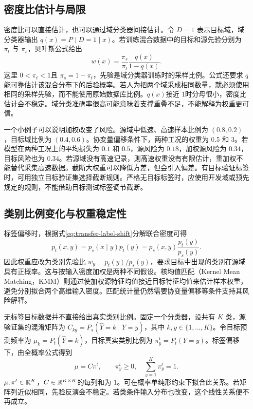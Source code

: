 \subsection{密度比估计与局限}
密度比可以直接估计，也可以通过域分类器间接估计。令 $D=1$ 表示目标域，域分类器输出 $q(x)=P(D=1\mid x)$。若训练混合数据中的目标和源先验分别为 $\pi_t$ 与 $\pi_s$，贝叶斯公式给出
\begin{equation}
 w(x)=\frac{\pi_s}{\pi_t}\frac{q(x)}{1-q(x)}.
\label{eq:transfer-domain-classifier-ratio}
\end{equation}
这里 $0<\pi_t<1$且 $\pi_s=1-\pi_t$，先验是域分类器训练时的采样比例。公式还要求 $q$能可靠估计该混合分布下的后验概率。若人为把两个域采成相同数量，就必须使用相同的采样先验，而不能使用原始数据库比例。$q(x)$接近 $1$时分母很小，密度比估计会不稳定。域分类准确率很高可能意味着支撑重叠不足，不能解释为权重更可信。

一个小例子可以说明加权改变了风险。源域中低速、高速样本比例为 $(0.8,0.2)$，目标域比例为 $(0.4,0.6)$。协变量偏移条件下，两种工况的权重为 $0.5$ 和 $3$。若模型在两种工况上的平均损失为 $0.1$ 和 $0.5$，源风险为 $0.18$，加权源风险为 $0.34$，目标风险也为 $0.34$。若源域没有高速记录，则高速权重没有有限估计，重加权不能替代采集高速数据。截断大权重可以降低方差，但会引入偏差。有目标验证标签时，可用独立目标验证集选择截断规则。严格无目标标签时，应使用开发域或预先规定的规则，不能借助目标测试标签调节截断。

\subsection{类别比例变化与权重稳定性}
标签偏移时，根据式\eqref{eq:transfer-label-shift}分解联合密度可得
\begin{equation}
 p_t(x,y)=p_s(x\mid y)p_t(y)
 =p_s(x,y)\frac{p_t(y)}{p_s(y)}.
\end{equation}
因此权重应改为类别先验比 $w_y=p_t(y)/p_s(y)$，要求目标中出现的类别在源域具有正概率。这与按输入密度加权是两种不同假设。核均值匹配（Kernel Mean Matching，KMM）则通过使加权源特征均值接近目标特征均值来估计样本权重，避免分别拟合两个高维输入密度\cite{huang2007kmm}。匹配统计量仍然需要协变量偏移等条件支持其风险解释。

无标签目标数据并不直接给出真实类别比例。固定一个分类器，设共有 $K$ 类，源验证集的混淆矩阵为 $C_{ky}=P_s(\widehat Y=k\mid Y=y)$，其中 $k,y\in\{1,\ldots,K\}$。令目标预测频率为 $\mu_k=P_t(\widehat Y=k)$，目标真实类别比例为 $\pi_y^t=P_t(Y=y)$。标签偏移下，由全概率公式得到
\begin{equation}
 \mu=C\pi^t,\qquad \pi_y^t\geq0,\quad \sum_{y=1}^K\pi_y^t=1.
\end{equation}
$\mu,\pi^t\in\mathbb{R}^K$，$C\in\mathbb{R}^{K\times K}$的每列和为 $1$。可在概率单纯形约束下拟合此关系。若矩阵列近似相同，先验反演会不稳定。若类条件输入分布也改变，这个线性关系便不再成立。

